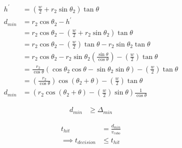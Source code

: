 \documentclass{article}
\begin{document}
	\begin{align}
	h^{\prime} &= \left(\frac{w}{2} + r_{2} \sin{\theta_{2}}\right) \tan{\theta} \\
	d_{min} &= r_{2} \cos{\theta_{2}} - h^{\prime} \\
	&= r_{2} \cos{\theta_{2}} - \left(\frac{w}{2} + r_{2} \sin{\theta_{2}}\right) \tan{\theta} \\
	&= r_{2} \cos{\theta_{2}} - \left(\frac{w}{2}\right) \tan{\theta} - r_{2} \sin{\theta_{2}} \tan{\theta} \\
	&= r_{2} \cos{\theta_{2}} - r_{2} \sin{\theta_{2}} \left(\frac{\sin{\theta}}{\cos{\theta}}\right) - \left(\frac{w}{2}\right) \tan{\theta} \\
	&= \frac{r_{2}}{\cos{\theta}} \left(\cos{\theta_{2}} \cos{\theta} - \sin{\theta_{2}} \sin{\theta}\right) - \left(\frac{w}{2}\right) \tan{\theta} \\
	&= \left(\frac{r_{2}}{\cos{\theta}}\right) \cos{\left(\theta_{2} + \theta\right)} - \left(\frac{w}{2}\right) \tan{\theta} \\
	d_{min} &= \left(r_{2} \cos{\left(\theta_{2} + \theta\right)} - \left(\frac{w}{2}\right) \sin{\theta}\right) \frac{1}{\cos{\theta}}
	\end{align}
	
	\begin{align}
	d_{min} &\ge \Delta_{min}
	\end{align}
	
	\begin{align}
	t_{hit} &= \frac{d_{min}}{v_{robo}} \\
	\implies t_{decision} &\le t_{hit}
	\end{align}
	
\end{document}
